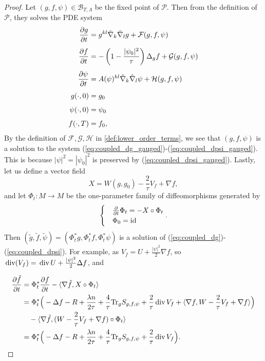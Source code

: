 \documentclass{amsart}
\theoremstyle{definition}
\theoremstyle{remark}
\numberwithin{equation}{section}
\newcommand{\Tr}{\textup{Tr}}
\newcommand{\id}{\textup{id}}
\renewcommand{\div}{\,\textup{div}}
\newcommand{\D}[2]{\frac{\partial #1}{\partial #2}}
\begin{document}
\begin{proof}
	Let $(g,f,\psi)\in \mathcal{B}_{T,\Lambda}$ be the fixed point of $\mathcal{P}$. Then from the definition of $\mathcal{P}$, they solves the PDE system
	\begin{equation}
		\begin{aligned}
			\D{g}{t}  & =  g^{kl}\hat{\nabla}_k\hat{\nabla}_lg + \mathcal{F}(g,f,\psi)\\[1ex]
			\D{f}{t} & = -\left( 1 - \frac{|\psi_0|^2}{\tau}\right)\Delta_{g}f+   \mathcal{G}(g, f,\psi)\\[1ex]
			\D{\psi}{t}  & = A(\psi)^{kl}\hat{\nabla}_k\hat{\nabla}_l\psi + \mathcal{H}(g, f,\psi)\\[1ex]
			\notag g(\cdot,0) &= g_0\\[1ex]
			\notag \psi(\cdot,0) &= \psi_0\\[1ex]
			\notag f(\cdot,T) &= f_0,
		\end{aligned}
	\end{equation}
By the definition of $\mathcal{F},\mathcal{G},\mathcal{H}$ in \ref{def:lower_order_terms}, we see that $(g,f,\psi)$ is a solution to the system (\ref{eq:coupled_dg_gauged})-(\ref{eq:coupled_dpsi_gauged}). This is because $|\psi|^2 = |\psi_0|^2$ is preserved by (\ref{eq:coupled_dpsi_gauged}). Lastly, let us define a vector field
	\[	X = W(g,g_0) - \frac{2}{\tau}V_f + \nabla f,\]
	and let $\Phi_t:M\to M$ be the one-parameter family of diffeomorphisms generated by
	\begin{align*}
		\begin{cases}
			&\frac{\partial}{\partial t}\Phi_t = -X\circ\Phi_t\\
			&\Phi_0 = \id
		\end{cases}.
	\end{align*}
	Then $(\tilde{g},\tilde{f},\tilde{\psi}) = (\Phi_t^*g, \Phi_t^*f, \Phi_t^*\psi)$ is a solution of (\ref{eq:coupled_dg})-(\ref{eq:coupled_dpsi}). For example, as $V_f = U + \frac{|\psi|^2}{2}\nabla f$, so $\div(V_f) = \div\, U + \frac{|\psi|^2}{2}\Delta f$, and 
	
	\begin{align*}
		\D{\tilde{f}}{t} &= \Phi_t^* \D{f}{t} - \langle\nabla \tilde{f}, X\circ\Phi_t\rangle\\
		& =  \Phi_t^*\Big( -\Delta f - R + \frac{\lambda n}{2\tau} +\frac{4}{\tau} \Tr_g S_{g,f,\psi} + \frac{2}{\tau}\div\, V_f  + \langle \nabla f, W - \frac{2}{\tau}V_f + \nabla f\rangle\Big)\\
		&\quad - \langle\nabla \tilde{f}, (W - \frac{2}{\tau}V_f + \nabla f)\circ\Phi_t\rangle\\
		&=\Phi_t^*\Big( -\Delta f - R + \frac{\lambda n}{2\tau} +\frac{4}{\tau} \Tr_g S_{g,f,\psi} + \frac{2}{\tau}\div\, V_f\Big).
	\end{align*}
\end{proof}
\end{document}
